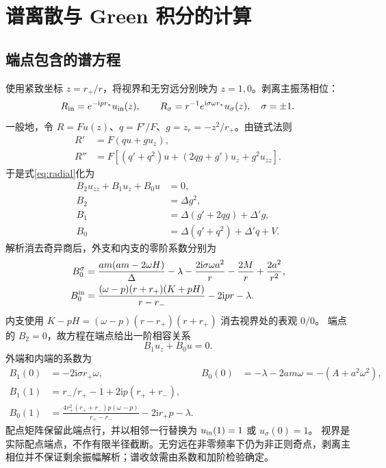 \documentclass[UTF8,fontset=fandol,11pt,a4paper]{ctexart}
\newcommand{\ii}{\mathrm i}
\numberwithin{equation}{section}
\begin{document}
\section{谱离散与 Green 积分的计算}
\label{sec:numerical}
\subsection{端点包含的谱方程}
使用紧致坐标 $z=r_+/r$，将视界和无穷远分别映为 $z=1,0$。剥离主振荡相位：
\begin{equation}
R_{\rm in}=e^{-\ii p r_*}u_{\rm in}(z),\qquad
R_\sigma=r^{-1}e^{\ii\sigma\omega r_*}u_\sigma(z),\quad\sigma=\pm1.
\end{equation}
一般地，令 $R=Fu(z)$、$q=F'/F$、$g=z_r=-z^2/r_+$。由链式法则
\begin{align}
R'&=F(qu+gu_z),\\
R''&=F[(q'+q^2)u+(2qg+g')u_z+g^2u_{zz}].
\end{align}
于是式\eqref{eq:radial}化为
\begin{align}
B_2u_{zz}+B_1u_z+B_0u&=0,\\
B_2&=\Delta g^2,\\
B_1&=\Delta(g'+2qg)+\Delta'g,\\
B_0&=\Delta(q'+q^2)+\Delta'q+V.
\end{align}
解析消去奇异商后，外支和内支的零阶系数分别为
\begin{align}
B_0^\sigma&=\frac{am(am-2\omega H)}\Delta-\lambda
-\frac{2\ii\sigma\omega a^2}{r}-\frac{2M}{r}+\frac{2a^2}{r^2},\\
B_0^{\rm in}&=\frac{(\omega-p)(r+r_+)(K+pH)}{r-r_-}-2\ii pr-\lambda.
\end{align}
内支使用 $K-pH=(\omega-p)(r-r_+)(r+r_+)$ 消去视界处的表观 $0/0$。
端点的 $B_2=0$，故方程在端点给出一阶相容关系
\begin{equation}B_1u_z+B_0u=0.\end{equation}
外端和内端的系数为
\begin{align}
B_1(0)&=-2\ii\sigma r_+\omega,&B_0(0)&=-\lambda-2am\omega=-(A+a^2\omega^2),\\
B_1(1)&=r_-/r_+-1+2\ii p(r_++r_-),\\
B_0(1)&=\frac{4r_+^2(r_++r_-)p(\omega-p)}{r_+-r_-}-2\ii r_+p-\lambda.
\end{align}
配点矩阵保留此端点行，并以相邻一行替换为 $u_{\rm in}(1)=1$ 或 $u_\sigma(0)=1$。
视界是实际配点端点，不作有限半径截断。无穷远在非零频率下仍为非正则奇点，剥离主相位并不保证剩余振幅解析；谱收敛需由系数和加阶检验确定。
\end{document}
